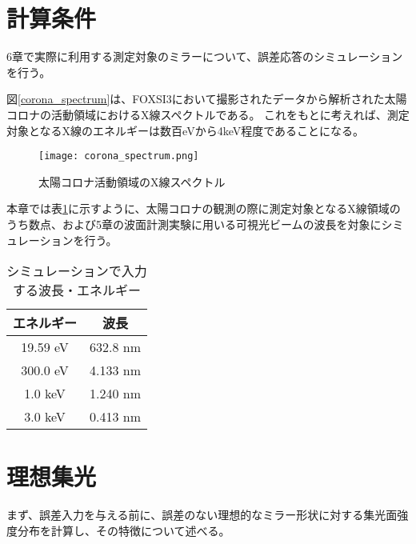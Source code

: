 \clearpage
\newpage

\section{計算条件}
6章で実際に利用する測定対象のミラーについて、誤差応答のシミュレーションを行う。

図\ref{corona_spectrum}は、FOXSI3において撮影されたデータから解析された太陽コロナの活動領域におけるX線スペクトルである。\cite{2019AGUFMSH31C3315V}
これをもとに考えれば、測定対象となるX線のエネルギーは数百eVから4keV程度であることになる。

\begin{figure}[ht]
\centering
\texttt{[image: corona\_spectrum.png]}
\caption{太陽コロナ活動領域のX線スペクトル}
\label{fig:corona_spectrum}
\end{figure}

本章では表\ref{tb:simulation_target_energy}に示すように、太陽コロナの観測の際に測定対象となるX線領域のうち数点、および5章の波面計測実験に用いる可視光ビームの波長を対象にシミュレーションを行う。

\begin{table}[!ht]
\begin{center}
  \begin{tabular}{|c|c|} \hline
    エネルギー & 波長 \\ \hline
    19.59 eV & 632.8 nm \\
    300.0 eV & 4.133 nm  \\
    1.0 keV & 1.240 nm  \\
    3.0 keV & 0.413 nm  \\ \hline
  \end{tabular}
  \caption{シミュレーションで入力する波長・エネルギー}
  \label{tb:simulation_target_energy}
\end{center}
\end{table}

\clearpage
\newpage

\section{理想集光}
\label{chap2_ideal_focusing}

まず、誤差入力を与える前に、誤差のない理想的なミラー形状に対する集光面強度分布を計算し、その特徴について述べる。

